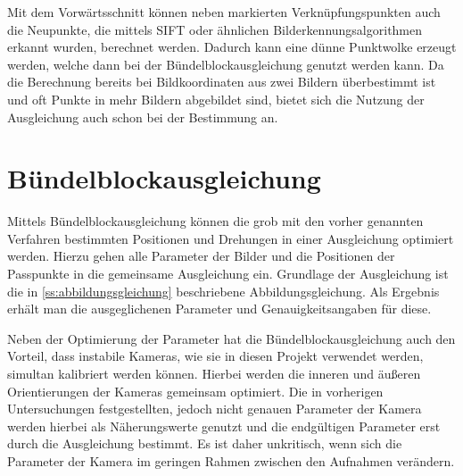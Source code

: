 \documentclass[./00PhotoBox.tex]{subfiles}
\begin{document}
Mit dem Vorwärts\-schnitt können neben markierten Verknüpfungspunkten auch die Neupunkte, die mittels SIFT oder ähnlichen Bild\-erkennungs\-algorithmen erkannt wurden, berechnet werden. Dadurch kann eine dünne Punktwolke erzeugt werden, welche dann bei der Bündelblockausgleichung genutzt werden kann. Da die Berechnung bereits bei Bildkoordinaten aus zwei Bildern überbestimmt ist und oft Punkte in mehr Bildern abgebildet sind, bietet sich die Nutzung der Ausgleichung auch schon bei der Bestimmung an. \citep[S. 385]{luhmann}

\section{Bündelblockausgleichung}
\label{s:buendelblock}
Mittels Bündelblockausgleichung können die grob mit den vorher genannten Verfahren bestimmten Positionen und Drehungen in einer Ausgleichung optimiert werden. Hierzu gehen alle Parameter der Bilder und die Positionen der Passpunkte in die gemeinsame Ausgleichung ein. Grundlage der Ausgleichung ist die in \autoref{ss:abbildungsgleichung} beschriebene Abbildungsgleichung. Als Ergebnis erhält man die ausgeglichenen Parameter und Genauigkeitsangaben für diese. \citep[S. 343ff]{luhmann}

Neben der Optimierung der Parameter hat die Bündelblockausgleichung auch den Vorteil, dass instabile Kameras, wie sie in diesen Projekt verwendet werden, simultan kalibriert werden können. Hierbei werden die inneren und äußeren Orientierungen der Kameras gemeinsam optimiert. Die in vorherigen Untersuchungen festgestellten, jedoch nicht genauen Parameter der Kamera werden hierbei als Näherungswerte genutzt und die endgültigen Parameter erst durch die Ausgleichung bestimmt. Es ist daher unkritisch, wenn sich die Parameter der Kamera im geringen Rahmen zwischen den Aufnahmen verändern. \citep[S. 357f]{luhmann}
\end{document}
